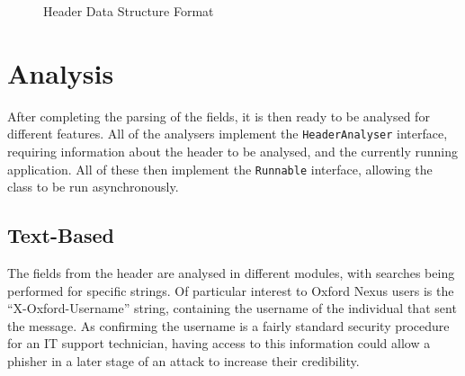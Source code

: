 \begin{figure}
\centering
{}
	\caption{Header Data Structure Format}
	\label{fig:hea}
\end{figure}


\section{Analysis}

After completing the parsing of the fields, it is then ready to be analysed for
different features.  All of the analysers implement the \texttt{HeaderAnalyser}
interface, requiring information about the header to be analysed, and the
currently running application.  All of these then implement the
\texttt{Runnable} interface, allowing the class to be run asynchronously.

\subsection{Text-Based}

The fields from the header are analysed in different modules, with searches
being performed for specific strings.  Of particular interest to Oxford Nexus
users is the ``X-Oxford-Username'' string, containing the username of the
individual that sent the message.  As confirming the username is a fairly
standard security procedure for an IT support technician, having access to this
information could allow a phisher in a later stage of an attack to increase
their credibility.

